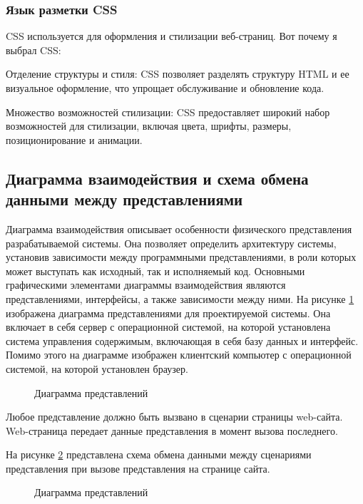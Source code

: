 \subsubsection{Язык разметки CSS}

CSS используется для оформления и стилизации веб-страниц. Вот почему я выбрал CSS:

Отделение структуры и стиля: CSS позволяет разделять структуру HTML и ее визуальное оформление, что упрощает обслуживание и обновление кода.

Множество возможностей стилизации: CSS предоставляет широкий набор возможностей для стилизации, включая цвета, шрифты, размеры, позиционирование и анимации.

\subsection{Диаграмма взаимодействия и схема обмена данными между представлениями}

Диаграмма взаимодействия описывает особенности физического представления разрабатываемой системы. Она позволяет определить архитектуру системы, установив зависимости между программными представлениями, в роли которых может выступать как исходный, так и исполняемый код. Основными графическими элементами диаграммы взаимодействия являются представлениями, интерфейсы, а также зависимости между ними. На рисунке \ref{comp:image} изображена диаграмма представлениями для проектируемой системы. Она включает в себя сервер с операционной системой, на которой установлена система управления содержимым, включающая в себя базу данных и интерфейс. Помимо этого на диаграмме изображен клиентский компьютер с операционной системой, на которой установлен браузер.

\begin{figure}[ht]
\caption{Диаграмма представлений}
\label{comp:image}
\end{figure}

Любое представление должно быть вызвано в сценарии страницы web-сайта. Web-страница передает данные представления в момент вызова последнего.

На рисунке \ref{data:image} представлена схема обмена данными между сценариями представления при вызове представления на странице сайта.

\begin{figure}[ht]
\caption{Диаграмма представлений}
\label{data:image}
\end{figure}

